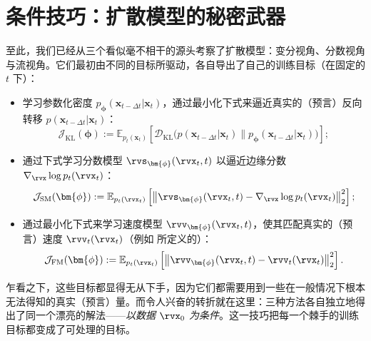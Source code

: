 \section{条件技巧：扩散模型的秘密武器}\label{sec:conditional-trick}
至此，我们已经从三个看似毫不相干的源头考察了扩散模型：变分视角、分数视角与流视角。它们最初由不同的目标所驱动，各自导出了自己的训练目标（在固定的 $t$ 下）：
\begin{itemize}
    \item {} 学习参数化密度 $p_{\bm{\phi}}(\mathbf{x}_{t-\Delta t}|\mathbf{x}_t)$，通过最小化下式来逼近真实的（预言）反向转移 $p(\mathbf{x}_{t-\Delta t}|\mathbf{x}_t)$：
    \[
    \mathcal{J}_{\text{KL}}(\bm{\phi}) := \mathbb{E}_{p_t(\mathbf{x}_t)}\left[
        \mathcal{D}_{\mathrm{KL}}\big(p(\mathbf{x}_{t-\Delta t}|\mathbf{x}_t) \| p_{\bm{\phi}}(\mathbf{x}_{t-\Delta t}|\mathbf{x}_t)\big)
    \right];
    \]
    \item {} 通过下式学习分数模型 $\rvs_{\bm{\phi}}(\rvx_t, t)$ 以逼近边缘分数 $\nabla_{\rvx} \log p_t(\rvx_t)$：
    \[
    \mathcal{J}_{\text{SM}}(\bm{\phi}) := \mathbb{E}_{p_t(\rvx_t)}\left[
       \left\| \rvs_{\bm{\phi}}(\rvx_t, t) - \nabla_{\rvx} \log p_t(\rvx_t) \right\|_2^2
    \right];
    \]
    \item {} 通过最小化下式来学习速度模型 $\rvv_{\bm{\phi}}(\rvx_t, t)$，使其匹配真实的（预言）速度 $\rvv_t(\rvx_t)$（例如  所定义的）：
    \[
    \mathcal{J}_{\text{FM}}(\bm{\phi}) := \mathbb{E}_{p_t(\rvx_t)} \left[
        \left\| \rvv_{\bm{\phi}}(\rvx_t, t) - \rvv_t(\rvx_t) \right\|_2^2
    \right].
    \]
\end{itemize}
乍看之下，这些目标都显得无从下手，因为它们都需要用到一些在一般情况下根本无法得知的真实（预言）量。而令人兴奋的转折就在这里：三种方法各自独立地得出了同一个漂亮的解法——\emph{以数据 $\rvx_0$ 为条件}。这一技巧把每一个棘手的训练目标都变成了可处理的目标。


